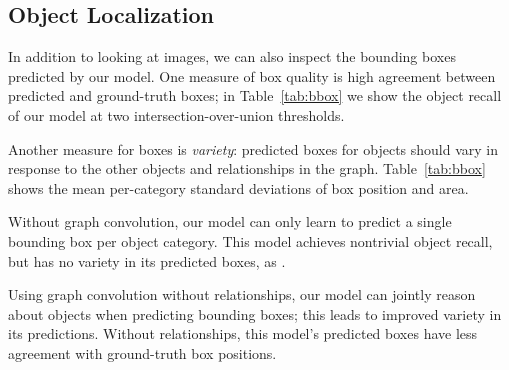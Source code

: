 \documentclass[10pt,twocolumn,letterpaper]{article}
\begin{document}
\begin{table}
  \centering
  \setlength{\tabcolsep}{0.75mm}
  \vspace{1mm}
  \caption{
    Statistics of predicted bounding boxes.
    R@ is object recall with an IoU threshold of , and measures agreement with ground-truth boxes.
     and  measure box variety by computing the standard deviation of box -positions and areas within
    each object category and then averaging across categories.
  }
  \vspace{-2mm}
  \label{tab:bbox}
\end{table}
 
\subsection{Object Localization}
In addition to looking at images, we can also inspect
the bounding boxes predicted by our model. One measure of box quality is
high agreement between predicted and ground-truth boxes; in
Table~\ref{tab:bbox} we show the object recall of our model at two
intersection-over-union thresholds.

Another measure for boxes is \emph{variety}: predicted boxes for objects 
should vary in response to the other objects and relationships in the graph.
Table~\ref{tab:bbox} shows the mean
per-category standard deviations of box position and area.

Without graph convolution, our model can only learn to predict a single bounding
box per object category. This model achieves nontrivial object recall, but has no
variety in its predicted boxes, as .

Using graph convolution without relationships, our model can jointly reason about
objects when predicting bounding boxes; this leads to improved variety in its
predictions. Without relationships, this model's predicted boxes have
less agreement with ground-truth box positions.
\end{document}
